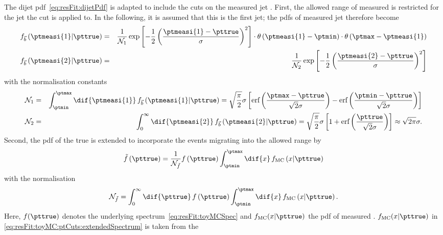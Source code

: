 \documentclass[a4paper]{cmspaper} %
\begin{document}
The dijet pdf~\eqref{eq:resFit:dijetPdf} is adapted to include the cuts on the measured jet \pt.
First, the allowed range of measured \pt is restricted for the jet the \pt cut is applied to.
In the following, it is assumed that this is the first jet; the pdfs of measured jet \pt therefore become
\begin{eqnarray*}
  f_{\vec{b}}\left(\ptmeasi{1}|\pttrue\right) & = & 
  \frac{1}{\mathcal{N}_{1}}\exp\left[-\frac{1}{2}\left(\frac{\ptmeasi{1}
        - \pttrue}{\sigma}\right)^{2}\right]
  \cdot\theta\left(\ptmeasi{1} - \ptmin\right)
  \cdot\theta\left(\ptmax - \ptmeasi{1}\right) \\
  f_{\vec{b}}\left(\ptmeasi{2}|\pttrue\right) & = & 
  \frac{1}{\mathcal{N}_{2}}\exp\left[-\frac{1}{2}\left(\frac{\ptmeasi{2}
        - \pttrue}{\sigma}\right)^{2}\right] \\
\end{eqnarray*}
with the normalisation constants
\begin{eqnarray*}
  \mathcal{N}_{1} & = &
  \int^{\ptmax}_{\ptmin}\dif{\ptmeasi{1}}\,f_{\vec{b}}\left(\ptmeasi{1}|\pttrue\right)
  = \sqrt{\frac{\pi}{2}}\sigma \left[ \text{erf}\left(\frac{\ptmax -
        \pttrue}{\sqrt{2}\sigma}\right) - \text{erf}\left(\frac{\ptmin
        - \pttrue}{\sqrt{2}\sigma}\right)\right] \\
  \mathcal{N}_{2} & = &
  \int^{\infty}_{0}\dif{\ptmeasi{2}}\,f_{\vec{b}}\left(\ptmeasi{2}|\pttrue\right)
  = \sqrt{\frac{\pi}{2}}\sigma \left[ 1 +
    \text{erf}\left(\frac{\pttrue}{\sqrt{2}\sigma}\right)\right]
  \approx \sqrt{2\pi}\sigma.
\end{eqnarray*}
Second, the pdf of the true \pt is extended to incorporate the events
migrating into the allowed \pt range by
\begin{equation}
  \label{eq:resFit:toyMC:ptCuts:extendedSpectrum}
  \tilde{f}\left(\pttrue\right) = \frac{1}{\mathcal{N}_{\tilde{f}}}
  f\left(\pttrue\right) \int^{\ptmax}_{\ptmin}\dif{x}\,f_{\text{MC}}\left(x|\pttrue\right)
\end{equation}
with the normalisation
\begin{equation*}
  \mathcal{N}_{\tilde{f}} = \int^{\infty}_{0}\dif{\pttrue}\,
  f\left(\pttrue\right) \int^{\ptmax}_{\ptmin}\dif{x}\,f_{\text{MC}}\left(x|\pttrue\right).
\end{equation*}
Here, $f(\pttrue)$ denotes the underlying spectrum~\eqref{eq:resFit:toyMCSpec} and
$f_{\text{MC}}(x|\pttrue)$ the pdf of measured \pt.
$f_{\text{MC}}(x|\pttrue)$ in \eqref{eq:resFit:toyMC:ptCuts:extendedSpectrum} is taken from the
\end{document}
